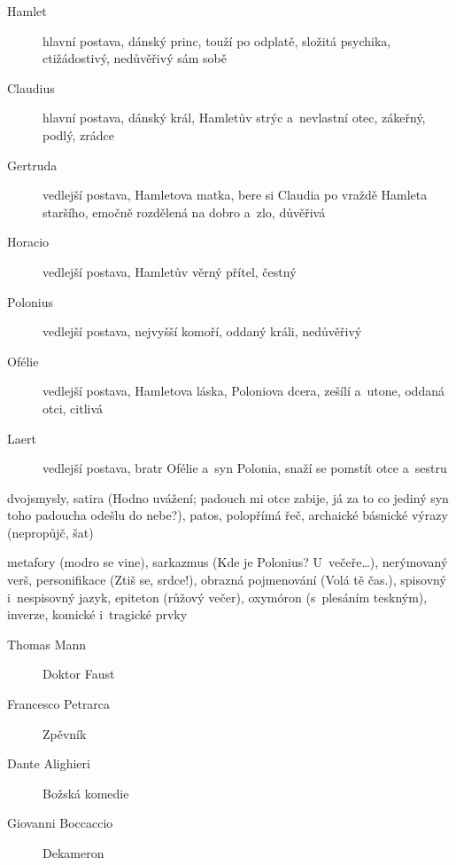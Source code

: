 {
\begin{description}
\item[Hamlet] hlavní postava, dánský princ, touží po odplatě, složitá psychika,
	ctižádostivý, nedůvěřivý sám sobě
\item[Claudius] hlavní postava, dánský král, Hamletův strýc a~nevlastní otec,
	zákeřný, podlý, zrádce
\item[Gertruda] vedlejší postava, Hamletova matka, bere si Claudia po vraždě
	Hamleta staršího, emočně rozdělená na dobro a~zlo, důvěřivá
\item[Horacio] vedlejší postava, Hamletův věrný přítel, čestný
\item[Polonius] vedlejší postava, nejvyšší komoří, oddaný králi, nedůvěřivý
\item[Ofélie] vedlejší postava, Hamletova láska, Poloniova dcera, zešílí
	a~utone, oddaná otci, citlivá
\item[Laert] vedlejší postava, bratr Ofélie a~syn Polonia, snaží se pomstít
	otce a~sestru
\end{description}

{dvojsmysly, satira (Hodno uvážení; padouch mi otce zabije, já za to co
jediný syn toho padoucha odešlu do nebe?), patos, polopřímá řeč, archaické 
básnické výrazy (nepropůjč, šat)}


\newpart

{metafory (modro se vine), sarkazmus (Kde je Polonius? U~večeře\dots), 
nerýmovaný verš, personifikace (Ztiš se, srdce!), obrazná pojmenování 
(Volá tě čas.), spisovný i~nespisovný jazyk, epiteton (růžový večer), 
oxymóron (s~plesáním teskným), inverze, komické i~tragické prvky}



\begin{description}
\item[Thomas Mann] Doktor Faust
\item[Francesco Petrarca] Zpěvník
\item[Dante Alighieri] Božská komedie
\item[Giovanni Boccaccio] Dekameron
\end{description}
}
